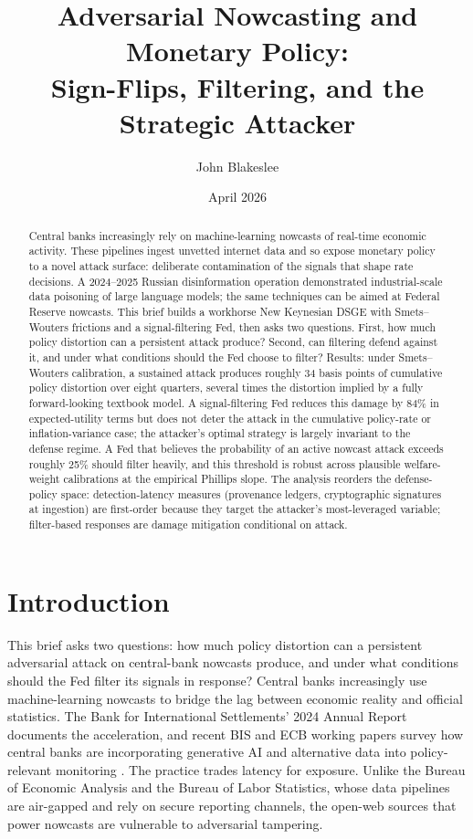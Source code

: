 \documentclass[12pt]{article}
\title{\Large\textbf{Adversarial Nowcasting and Monetary Policy:\\Sign-Flips, Filtering, and the Strategic Attacker}}
\author{John Blakeslee}
\date{April 2026}
\begin{document}
\maketitle

\begin{abstract}
\noindent
Central banks increasingly rely on machine-learning nowcasts of real-time economic activity. These pipelines ingest unvetted internet data and so expose monetary policy to a novel attack surface: deliberate contamination of the signals that shape rate decisions. A 2024--2025 Russian disinformation operation demonstrated industrial-scale data poisoning of large language models; the same techniques can be aimed at Federal Reserve nowcasts. This brief builds a workhorse New Keynesian DSGE with Smets--Wouters frictions and a signal-filtering Fed, then asks two questions. First, how much policy distortion can a persistent attack produce? Second, can filtering defend against it, and under what conditions should the Fed choose to filter? Results: under Smets--Wouters calibration, a sustained attack produces roughly 34 basis points of cumulative policy distortion over eight quarters, several times the distortion implied by a fully forward-looking textbook model. A signal-filtering Fed reduces this damage by 84\% in expected-utility terms but does not deter the attack in the cumulative policy-rate or inflation-variance case; the attacker's optimal strategy is largely invariant to the defense regime. A Fed that believes the probability of an active nowcast attack exceeds roughly 25\% should filter heavily, and this threshold is robust across plausible welfare-weight calibrations at the empirical Phillips slope. The analysis reorders the defense-policy space: detection-latency measures (provenance ledgers, cryptographic signatures at ingestion) are first-order because they target the attacker's most-leveraged variable; filter-based responses are damage mitigation conditional on attack.
\end{abstract}

\section{Introduction}

This brief asks two questions: how much policy distortion can a persistent adversarial attack on central-bank nowcasts produce, and under what conditions should the Fed filter its signals in response? Central banks increasingly use machine-learning nowcasts to bridge the lag between economic reality and official statistics. The Bank for International Settlements' 2024 Annual Report documents the acceleration, and recent BIS and ECB working papers survey how central banks are incorporating generative AI and alternative data into policy-relevant monitoring \citep{bis2024, ecb2024ai, aldasoro2024gen}. The practice trades latency for exposure. Unlike the Bureau of Economic Analysis and the Bureau of Labor Statistics, whose data pipelines are air-gapped and rely on secure reporting channels, the open-web sources that power nowcasts are vulnerable to adversarial tampering.
\end{document}
